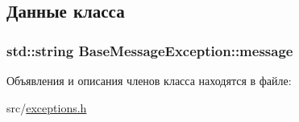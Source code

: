 \subsection{Данные класса}
\hypertarget{class_base_message_exception_adbf18cd63b2f9a2bc6b0bbe20ce9da58}{
\subsubsection[{message}]{\setlength{\rightskip}{0pt plus 5cm}std\-::string Base\-Message\-Exception\-::message\hspace{0.3cm}{\ttfamily [protected]}}}\label{class_base_message_exception_adbf18cd63b2f9a2bc6b0bbe20ce9da58}


Объявления и описания членов класса находятся в файле\-:\begin{DoxyCompactItemize}
\item 
src/\hyperlink{exceptions_8h}{exceptions.\-h}\end{DoxyCompactItemize}
